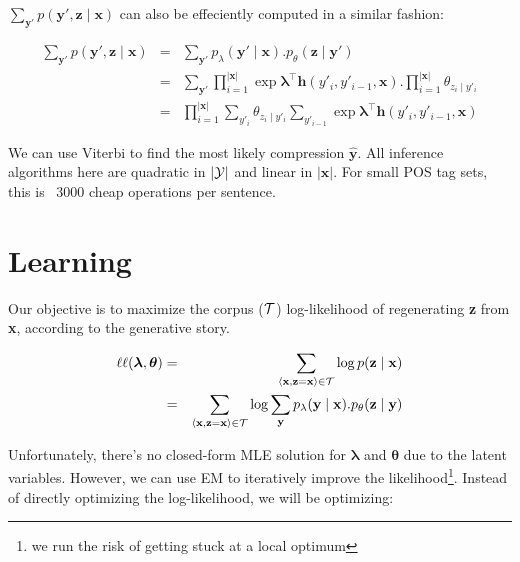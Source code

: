 \documentclass[11pt,onecolumn]{article}
\begin{document}
$\sum_{\mathbf{y'}} p(\mathbf{y'}, \mathbf{z} \mid \mathbf{x})$ can also be effeciently computed in a similar fashion:

\begin{eqnarray}
\sum_{\mathbf{y'}} p(\mathbf{y'}, \mathbf{z} \mid \mathbf{x}) &=& \sum_{\mathbf{y'}} p_\lambda(\mathbf{y'} \mid \mathbf{x}).p_\theta(\mathbf{z} \mid \mathbf{y'}) \\
&=& \sum_{\mathbf{y'}} \prod_{i=1}^{|\mathbf{x}|} \exp \boldsymbol{\lambda}^\top \mathbf{h}(y'_i, y'_{i-1}, \mathbf{x}) . \prod_{i=1}^{|\mathbf{x}|} \theta_{z_i\mid y'_i}\\
&=& \prod_{i=1}^{|\mathbf{x}|} \sum_{y'_i} \theta_{z_i\mid y'_i} \sum_{y'_{i-1}} \exp \boldsymbol{\lambda}^\top \mathbf{h}(y'_i, y'_{i-1}, \mathbf{x}) \label{eq:marginalizeY}
\end{eqnarray}

We can use Viterbi to find the most likely compression $\hat{\mathbf{y}}$. All inference algorithms here are quadratic in $|\cal{Y}|$ and linear in $|\mathbf{x}|$. For small POS tag sets, this is ~3000 cheap operations per sentence.

\section{Learning}

Our objective is to maximize the corpus ($\cal{T}$) log-likelihood of regenerating \textbf{z} from \textbf{x}, according to the generative story.

\begin{eqnarray}
\ell\ell(\boldsymbol{\lambda}, \boldsymbol{\theta}) &=& \sum_{\langle\mathbf{x},\mathbf{z}=\mathbf{x}\rangle \in \cal{T}} \log p(\mathbf{z}\mid\mathbf{x}) \\
 &=& \sum_{\langle\mathbf{x},\mathbf{z}=\mathbf{x}\rangle \in \cal{T}} \log \sum_{\mathbf{y}} p_\lambda(\mathbf{y}\mid\mathbf{x}).p_\theta(\mathbf{z}\mid\mathbf{y})\\
\end{eqnarray}

Unfortunately, there's no closed-form MLE solution for $\boldsymbol{\lambda}$ and $\boldsymbol{\theta}$ due to the latent variables. However, we can use EM to iteratively improve the likelihood\footnote{we run the risk of getting stuck at a local optimum}. Instead of directly optimizing the log-likelihood, we will be optimizing:
\end{document}
